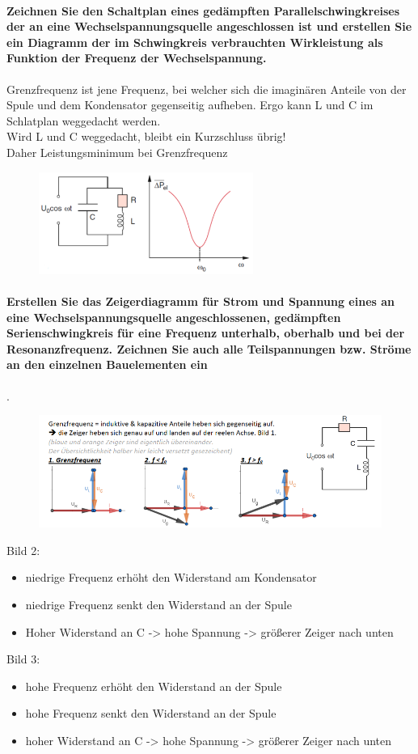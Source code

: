 \documentclass[a4paper, 11pt, parskip=half]{scrartcl}
\begin{document}
\paragraph{Zeichnen Sie den Schaltplan eines gedämpften Parallelschwingkreises der an eine
Wechselspannungsquelle angeschlossen ist und erstellen Sie ein Diagramm der im Schwingkreis
verbrauchten Wirkleistung als Funktion der Frequenz der Wechselspannung.}
Grenzfrequenz ist jene Frequenz, bei welcher sich die imaginären Anteile von der Spule und dem Kondensator gegenseitig aufheben. Ergo kann L und C im Schlatplan weggedacht werden.
\\
Wird L und C weggedacht, bleibt ein Kurzschluss übrig! \\
Daher Leistungsminimum bei Grenzfrequenz
\begin{figure}[H]
    \centering
    \includegraphics[width=7cm]{image/12/2.png}
\end{figure}

\paragraph{Erstellen Sie das Zeigerdiagramm für Strom und Spannung eines an eine
Wechselspannungsquelle angeschlossenen, gedämpften Serienschwingkreis für eine Frequenz unterhalb,
oberhalb und bei der Resonanzfrequenz. Zeichnen Sie auch alle Teilspannungen bzw. Ströme an den
einzelnen Bauelementen ein}.
\begin{figure}[H]
    \centering
    \includegraphics[width=14cm]{image/12/3.png}
\end{figure}
Bild 2:
\begin{itemize}
\item niedrige Frequenz erhöht den Widerstand am Kondensator
\item niedrige Frequenz senkt den Widerstand an der Spule
\item Hoher Widerstand an C -> hohe Spannung -> größerer Zeiger nach unten
\end{itemize}
Bild 3:
\begin{itemize}
\item hohe Frequenz erhöht den Widerstand an der Spule
\item hohe Frequenz senkt den Widerstand an der Spule
\item hoher Widerstand an C -> hohe Spannung -> größerer Zeiger nach unten
\end{itemize}
\end{document}
